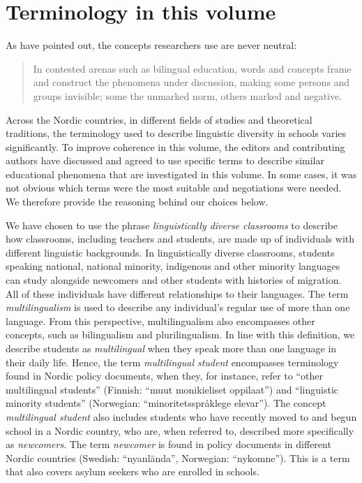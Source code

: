 \documentclass[output=paper]{langscibook}
\begin{document}
\section{Terminology in this volume}\label{sec:reath:3}

As \citet[3]{Skutnabb-KangasMcCarthy2008} have pointed out, the concepts researchers use are never neutral:

\begin{quote}
In contested arenas such as bilingual education, words and concepts frame and construct the phenomena under discussion, making some persons and groups invisible; some the unmarked norm, others marked and negative.
\end{quote}

Across the Nordic countries, in different fields of studies and theoretical traditions, the terminology used to describe linguistic diversity in schools varies significantly. To improve coherence in this volume, the editors and contributing authors have discussed and agreed to use specific terms to describe similar educational phenomena that are investigated in this volume. In some cases, it was not obvious which terms were the most suitable and negotiations were needed. We therefore provide the reasoning behind our choices below.   

We have chosen to use the phrase \textit{linguistically diverse classrooms} to describe how classrooms, including teachers and students, are made up of individuals with different linguistic backgrounds. In linguistically diverse classrooms, students speaking national, national minority, indigenous and other minority languages can study alongside newcomers and other students with histories of migration. All of these individuals have different relationships to their languages. The term \textit{multilingualism} is used to describe any individual’s regular use of more than one language. From this perspective, multilingualism also encompasses other concepts, such as bilingualism and plurilingualism. In line with this definition, we describe students as \textit{multilingual} when they speak more than one language in their daily life. Hence, the term \textit{multilingual student} encompasses terminology found in Nordic policy documents, when they, for instance, refer to “other multilingual students” (Finnish: “muut monikieliset oppilaat”) and “linguistic minority students” (Norwegian: “minoritetsspråklege elevar”). The concept \textit{multilingual student} also includes students who have recently moved to and begun school in a Nordic country, who are, when referred to, described more specifically as \textit{newcomers}. The term \textit{newcomer} is found in policy documents in different Nordic countries (Swedish: “nyanlända”, Norwegian: “nykomne”). This is a term that also covers asylum seekers who are enrolled in schools. 
\end{document}
